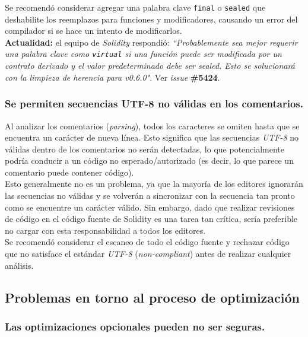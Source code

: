 Se recomendó considerar agregar una palabra clave \texttt{final} o \texttt{sealed} que deshabilite los reemplazos para funciones y modificadores, causando un error del compilador si se hace un intento de modificarlos.\\

\textbf{Actualidad:} el equipo de \textit{Solidity} respondió: \textit{``Probablemente sea mejor requerir una palabra clave como \texttt{virtual} si una función puede ser modificada por un contrato derivado y el valor predeterminado debe ser sealed. Esto se solucionará con la limpieza de herencia para v0.6.0"}\cite{GHProject9}. Ver \textit{issue} \textbf{\#5424}\cite{GHI5424}.\\

\subsubsection{Se permiten secuencias UTF-8 no válidas en los comentarios.}

Al analizar los comentarios (\textit{parsing}), todos los caracteres se omiten hasta que se encuentra un carácter de nueva línea. Esto significa que las secuencias \textit{UTF-8} no válidas dentro de los comentarios no serán detectadas, lo que potencialmente podría conducir a un código no esperado/autorizado (es decir, lo que parece un comentario puede contener código).\\

Esto generalmente no es un problema, ya que la mayoría de los editores ignorarán las secuencias no válidas y se volverán a sincronizar con la secuencia tan pronto como se encuentre un carácter válido. Sin embargo, dado que realizar revisiones de código en el código fuente de Solidity es una tarea tan crítica, sería preferible no cargar con esta responsabilidad a todos los editores.\\

Se recomendó considerar el escaneo de todo el código fuente y rechazar código que no satisface el estándar \textit{UTF-8} (\textit{non-compliant}) antes de realizar cualquier análisis.\\

\subsection{Problemas en torno al proceso de optimización}

\subsubsection{Las optimizaciones opcionales pueden no ser seguras.}

